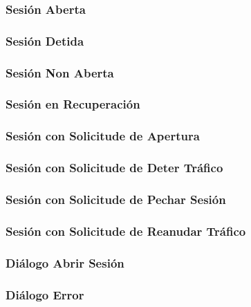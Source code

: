 \documentclass[a4paper,titlepage]{article}
\begin{document}
\subsubsection{Sesión Aberta}

\subsubsection{Sesión Detida}

\subsubsection{Sesión Non Aberta}

\subsubsection{Sesión en Recuperación}

\subsubsection{Sesión con Solicitude de Apertura}

\subsubsection{Sesión con Solicitude de Deter Tráfico}

\subsubsection{Sesión con Solicitude de Pechar Sesión}

\subsubsection{Sesión con Solicitude de Reanudar Tráfico}

\subsubsection{Diálogo Abrir Sesión}

\subsubsection{Diálogo Error}

\end{document}
